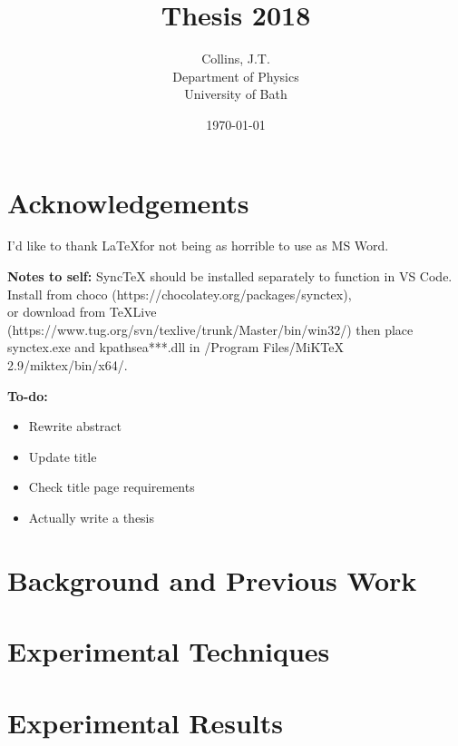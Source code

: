 \documentclass[11pt,a4paper,final]{report}
\title{Thesis 2018}
\author{
	Collins, J.T. \\ 
	Department of Physics\\
	University of Bath\\
}
\date{\today}
\begin{document}
\begin{titlepage}
    
\end{titlepage}

\clearpage
\tableofcontents
\clearpage

\begin{abstract}
    
\end{abstract}
\clearpage


\chapter*{Acknowledgements}

\color{red}
I'd like to thank \LaTeX  for not being as horrible to use as MS Word.

\noindent\textbf{Notes to self:}
\noindent SyncTeX should be installed separately to function in VS Code. 
\noindent Install from choco (https://chocolatey.org/packages/synctex), \\or download from TeXLive (https://www.tug.org/svn/texlive/trunk/Master/bin/win32/) then place synctex.exe and kpathsea***.dll in /Program Files/MiKTeX 2.9/miktex/bin/x64/.

\noindent\textbf{To-do:}
\begin{itemize}
	\item Rewrite abstract
	\item Update title
	\item Check title page requirements
    \item Actually write a thesis
\end{itemize}
\color{black}


\chapter{Background and Previous Work}\label{sec:background}




\chapter{Experimental Techniques}\label{sec:techniques}





\chapter{Experimental Results}\label{sec:results}
\clearpage
\clearpage
\clearpage
\clearpage




\clearpage

\appendix

\end{document}

